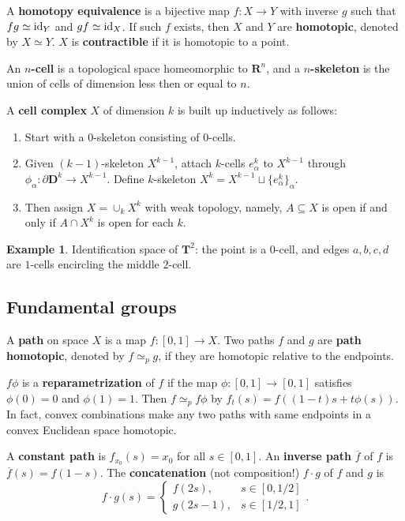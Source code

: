 \documentclass[11pt]{article}
\theoremstyle{definition}
\newtheorem*{example}{Example}
\theoremstyle{plain}
\theoremstyle{remark}
\newcommand{\id}{\textup{id}}
\newcommand{\R}{\mathbf{R}}
\newcommand{\D}{\mathbf{D}}
\begin{document}
A \textbf{homotopy equivalence} is a bijective map $f:X\to Y$ with inverse $g$ such that $fg\simeq\id_Y$ and $gf\simeq\id_X$. If such $f$ exists, then $X$ and $Y$ are \textbf{homotopic}, denoted by $X\simeq Y$. $X$ is \textbf{contractible} if it is homotopic to a point.\medbreak

An \textbf{$n$-cell} is a topological space homeomorphic to $\R^n$, and a \textbf{$n$-skeleton} is the union of cells of dimension less then or equal to $n$.\medbreak

A \textbf{cell complex} $X$ of dimension $k$ is built up inductively as follows:\begin{enumerate}
    \item Start with a $0$-skeleton consisting of $0$-cells.
    \item Given $(k-1)$-skeleton $X^{k-1}$, attach $k$-cells $e^k_\alpha$ to $X^{k-1}$ through $\phi_\alpha:\partial\D^k\to X^{k-1}$. Define $k$-skeleton $X^k=X^{k-1}\sqcup\{e^k_\alpha\}_\alpha$.
    \item Then assign $X=\cup_kX^k$ with weak topology, namely, $A\subseteq X$ is open if and only if $A\cap X^k$ is open for each $k$.
\end{enumerate}
\begin{example}
Identification space of $\mathbf{T}^2$: the point is a $0$-cell, and edges $a,b,c,d$ are $1$-cells encircling the middle $2$-cell.
\end{example} 

\subsection{Fundamental groups}\label{3}

A \textbf{path} on space $X$ is a map $f:[0,1]\to X$. Two paths $f$ and $g$ are \textbf{path homotopic}, denoted by $f\simeq_pg$, if they are homotopic relative to the endpoints.\medbreak

$f\phi$ is a \textbf{reparametrization} of $f$ if the map $\phi:[0,1]\to[0,1]$ satisfies $\phi(0)=0$ and $\phi(1)=1$. Then $f\simeq_p f\phi$ by $f_t(s)=f((1-t)s+t\phi(s))$. In fact, convex combinations make any two paths with same endpoints in a convex Euclidean space homotopic.\medbreak

A \textbf{constant path} is $f_{x_0}(s)=x_0$ for all $s\in[0,1]$. An \textbf{inverse path} $\overline{f}$ of $f$ is $\overline{f}(s)=f(1-s)$. The \textbf{concatenation} (not composition!) $f\cdot g$ of $f$ and $g$ is
\[f\cdot g(s)=\begin{cases}
f(2s),&s\in[0,1/2]\\g(2s-1),&s\in[1/2,1]
\end{cases}.\]\medbreak
\end{document}
